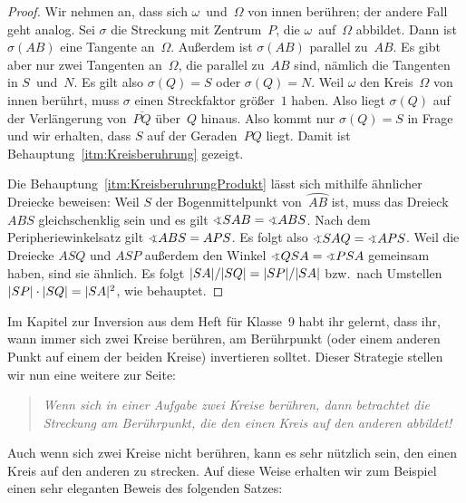 \begin{proof}
	Wir nehmen an, dass sich $\omega$~und~$\Omega$ von innen berühren; der andere Fall geht analog. Sei $\sigma$ die Streckung mit Zentrum~$P$, die $\omega$~auf~$\Omega$ abbildet. Dann ist $\sigma(AB)$ eine Tangente an~$\Omega$. Außerdem ist $\sigma(AB)$ parallel zu~$AB$. Es gibt aber nur zwei Tangenten an~$\Omega$, die parallel zu~$AB$ sind, nämlich die Tangenten in $S$~und~$N$. Es gilt also $\sigma(Q)=S$ oder $\sigma(Q)=N$. Weil $\omega$ den Kreis~$\Omega$ von innen berührt, muss $\sigma$ einen Streckfaktor
	größer~$1$ haben. Also liegt $\sigma(Q)$ auf der Verlängerung von~$\overline{PQ}$ über~$Q$ hinaus. Also kommt nur $\sigma(Q)=S$ in Frage und wir erhalten, dass $S$ auf der Geraden~$PQ$ liegt. Damit ist Behauptung~\ref{itm:Kreisberuhrung} gezeigt.
	
	Die Behauptung~\ref{itm:KreisberuhrungProdukt} lässt sich mithilfe ähnlicher Dreiecke beweisen: Weil $S$ der Bogenmittelpunkt von~$\wideparen{AB}$ ist, muss das Dreieck $ABS$ gleichschenklig sein und es gilt $\winkel SAB=\winkel ABS$. Nach dem Peripheriewinkelsatz gilt $\winkel ABS=APS$. Es folgt also $\winkel SAQ=\winkel APS$. Weil die Dreiecke $ASQ$ und $ASP$ außerdem den Winkel $\winkel QSA=\winkel PSA$ gemeinsam haben, sind sie ähnlich. Es folgt $\lvert SA\rvert/\lvert SQ\rvert=\lvert SP\rvert/\lvert SA\rvert$ bzw.\ nach Umstellen $\lvert SP\rvert\cdot\lvert SQ\rvert=\lvert SA\rvert^2$, wie behauptet.
\end{proof}

Im Kapitel zur Inversion aus dem Heft für Klasse~9 habt ihr gelernt, dass ihr, wann immer sich zwei Kreise berühren, am Berührpunkt (oder einem anderen Punkt auf einem der beiden Kreise) invertieren solltet. Dieser Strategie stellen wir nun eine weitere zur Seite:
\begin{quote}\itshape
	Wenn sich in einer Aufgabe zwei Kreise berühren, dann betrachtet die Streckung am Berührpunkt, die den einen Kreis auf den anderen abbildet!
\end{quote}
Auch wenn sich zwei Kreise nicht berühren, kann es sehr nützlich sein, den einen Kreis auf den anderen zu strecken. Auf diese Weise erhalten wir zum Beispiel einen sehr eleganten Beweis des folgenden Satzes:

